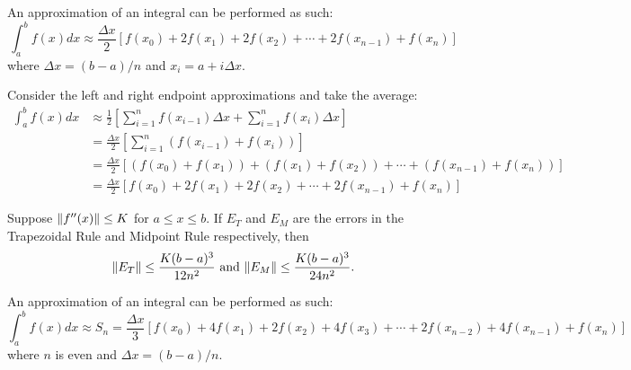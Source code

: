 \documentclass[a4paper,8pt]{article}
\begin{document}
\begin{outline}
    An approximation of an integral can be performed as such:
    \[
      \int_a^bf(x)dx \approx \frac{\Delta{x}}{2}\left[f(x_0)+2f(x_1)+2f(x_2)+\cdots+2f(x_{n-1})+f(x_n)\right]
    \]
    where \(\Delta{x} = (b-a)/n\) and \(x_i = a + i\Delta{x}\).

    \begin{justification}
      Consider the left and right endpoint approximations and take the average:
      \begin{align*}
        \int_a^bf(x)dx &\approx \frac{1}{2}\left[\sum_{i=1}^nf(x_{i-1})\Delta{x} + \sum_{i=1}^nf(x_i)\Delta{x}\right] \\
                       &= \frac{\Delta{x}}{2}\left[\sum_{i=1}^n (f(x_{i-1})+f(x_i))\right] \\
                       &= \frac{\Delta{x}}{2}\left[(f(x_0)+f(x_1)) + (f(x_1)+f(x_2)) + \cdots + (f(x_{n-1})+f(x_n))\right] \\
                       &= \frac{\Delta{x}}{2}\left[f(x_0)+2f(x_1)+2f(x_2)+\cdots+2f(x_{n-1})+f(x_n)\right]
      \end{align*}
    \end{justification}

    Suppose \(\|f''(x)\| \leq K\) for \(a \leq x \leq b\). If \(E_T\) and \(E_M\) are the errors in the
    Trapezoidal Rule and Midpoint Rule respectively, then \[ \|E_T\| \leq \frac{K(b-a)^3}{12n^2}\text{ and }
    \|E_M\| \leq \frac{K(b-a)^3}{24n^2}\text{.} \]

    An approximation of an integral can be performed as such:
    \[
      \int_a^bf(x)dx \approx S_n = \frac{\Delta{x}}{3}\left[f(x_0) + 4f(x_1) + 2f(x_2) + 4f(x_3) + \cdots +
                                   2f(x_{n-2}) + 4f(x_{n-1}) + f(x_n)\right]
    \]
    where \(n\) is even and \(\Delta{x} = (b-a)/n\).


\end{outline}
\end{document}
